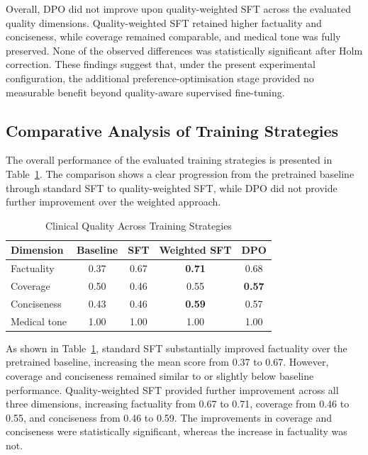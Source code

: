 \documentclass[ %
                    author={Aman Kumar Singh},
                supervisor={Dr. Edwin Simpson},
                    degree={MSc},
                     title={Quality-Aware Knowledge Distillation of Large Language Models for Efficient Personalised Clinical Report Generation},
                  subtitle={},
                      type={},
                      year={2021}]{dissertation}
\begin{document}
Overall, DPO did not improve upon quality-weighted SFT across the
evaluated quality dimensions. Quality-weighted SFT retained higher
factuality and conciseness, while coverage remained comparable, and
medical tone was fully preserved. None of the observed differences was
statistically significant after Holm correction. These findings suggest
that, under the present experimental configuration, the additional
preference-optimisation stage provided no measurable benefit beyond
quality-aware supervised fine-tuning.

\subsection{Comparative Analysis of Training Strategies}
\label{sec:comparative_training}

The overall performance of the evaluated training strategies is presented
in Table~\ref{tab:training_strategy_comparison}. The comparison shows a
clear progression from the pretrained baseline through standard SFT to
quality-weighted SFT, while DPO did not provide further improvement over
the weighted approach.
\vspace{-15pt}

\begin{table}[htbp]
\centering
\footnotesize
\caption{Clinical Quality Across Training Strategies}
\label{tab:training_strategy_comparison}
\begin{tabular}{lcccc}
\hline
\textbf{Dimension} & \textbf{Baseline} & \textbf{SFT}
& \textbf{Weighted SFT} & \textbf{DPO} \\
\hline
Factuality
& 0.37
& 0.67
& \textbf{0.71}
& 0.68 \\

Coverage
& 0.50
& 0.46
& 0.55
& \textbf{0.57} \\

Conciseness
& 0.43
& 0.46
& \textbf{0.59}
& 0.57 \\

Medical tone
& 1.00
& 1.00
& 1.00
& 1.00 \\
\hline
\end{tabular}
\end{table}

As shown in Table~\ref{tab:training_strategy_comparison}, standard SFT
substantially improved factuality over the pretrained baseline, increasing
the mean score from 0.37 to 0.67. However, coverage and conciseness
remained similar to or slightly below baseline performance. Quality-weighted
SFT provided further improvement across all three dimensions, increasing
factuality from 0.67 to 0.71, coverage from 0.46 to 0.55, and conciseness
from 0.46 to 0.59. The improvements in coverage and conciseness were
statistically significant, whereas the increase in factuality was not.
\end{document}
